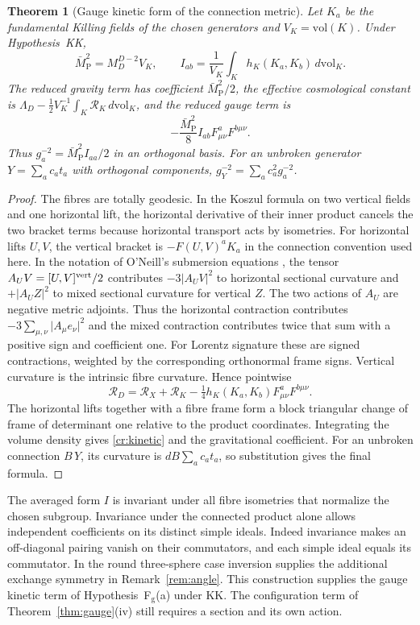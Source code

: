 \documentclass[aps,pra,onecolumn,superscriptaddress,nofootinbib,10pt]{revtex4-2}
\newtheorem{theorem}{Theorem}
\theoremstyle{definition}
\theoremstyle{remark}
\begin{document}
\begin{theorem}[Gauge kinetic form of the connection metric]\label{cr:eh}
Let $K_a$ be the fundamental Killing fields of the chosen generators
and $V_K=\mathrm{vol}(K)$. Under Hypothesis~KK,
\[
 \bar M_{\mathrm P}^2=M_D^{D-2}V_K,\qquad
 I_{ab}=\frac{1}{V_K}\int_K h_K(K_a,K_b)\,d\mathrm{vol}_K.
\]
The reduced gravity term has coefficient $\bar M_{\mathrm P}^2/2$,
the effective cosmological constant is
$\Lambda_D-\tfrac12 V_K^{-1}\int_K\mathcal R_K\,d\mathrm{vol}_K$,
and the reduced gauge term is
\begin{equation}\label{cr:kinetic}
 -\frac{\bar M_{\mathrm P}^2}{8} I_{ab}F^a_{\mu\nu}F^{b\mu\nu}.
\end{equation}
Thus $g_a^{-2}=\bar M_{\mathrm P}^2 I_{aa}/2$ in an orthogonal basis.
For an unbroken generator $Y=\sum_a c_a t_a$ with orthogonal
components, $g_Y^{-2}=\sum_a c_a^2g_a^{-2}$.
\end{theorem}
\begin{proof}
The fibres are totally geodesic. In the Koszul formula on two vertical
fields and one horizontal lift, the horizontal derivative of their
inner product cancels the two bracket terms because horizontal
transport acts by isometries. For horizontal lifts $U,V$, the vertical
bracket is $-F(U,V)^aK_a$ in the connection convention used here. In the
notation of O'Neill's submersion equations
\cite{cr:oneill,ONeill}, the tensor $A_UV=[U,V]^{\rm vert}/2$ contributes
$-3\lvert A_UV\rvert^2$ to horizontal sectional curvature and
$+\lvert A_U Z\rvert^2$ to mixed sectional curvature for vertical $Z$.
The two actions of $A_U$ are negative metric adjoints. Thus the
horizontal contraction contributes $-3\sum_{\mu,\nu}\lvert
A_\mu e_\nu\rvert^2$ and the mixed contraction contributes twice that
sum with a positive sign and coefficient one. For Lorentz signature
these are signed contractions, weighted by the corresponding
orthonormal frame signs. Vertical curvature is the intrinsic fibre
curvature. Hence pointwise
\[
 \mathcal R_D=\mathcal R_X+\mathcal R_K
       -\tfrac14 h_K(K_a,K_b)F^a_{\mu\nu}F^{b\mu\nu}.
\]
The horizontal lifts together with a fibre frame form a block
triangular change of frame of determinant one relative to the
product coordinates. Integrating the volume density gives
\eqref{cr:kinetic} and the gravitational coefficient.
For an unbroken connection $B\,Y$, its curvature is
$dB\sum_a c_at_a$, so substitution gives the final formula.
\end{proof}

The averaged form $I$ is invariant under all fibre isometries that
normalize the chosen subgroup. Invariance under the connected
product alone allows independent coefficients on its distinct
simple ideals. Indeed invariance makes an off-diagonal pairing
vanish on their commutators, and each simple ideal equals its
commutator. In the round three-sphere case inversion supplies
the additional exchange symmetry in Remark~\ref{rem:angle}.
This construction supplies the gauge kinetic term of
Hypothesis~F$_{\mathrm g}$(a) under KK. The configuration term of
Theorem~\ref{thm:gauge}(iv) still requires a section and its own action.
\end{document}
